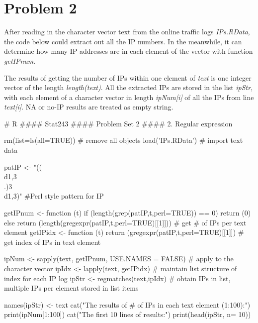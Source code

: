 \documentclass{article}
\begin{document}
\section*{Problem 2}

After reading in the character vector text from the online traffic logs \textit{IPs.RData}, the 
code below could extract out all the IP numbers. In the meanwhile, it can determine how many IP 
addresses are in each element of the vector with function \textit{getIPnum}.


The results of getting the number of IPs within one element of \textit{text} is one integer vector of 
the length \textit{length(text)}. All the extracted IPs are stored in the list \textit{ipStr}, 
with each element of a character vector in length \textit{ipNum[i]} of all the IPs from line \textit{text[i]}.
NA or no-IP results are treated as empty string.

# R
#### Stat243
#### Problem Set 2
#### 2. Regular expression

rm(list=ls(all=TRUE)) # remove all objects
load('IPs.RData') # import text data

patIP <- "((\\d{1,3}\\.){3}\\d{1,3})" #Perl style pattern for IP

getIPnum <- function (t) { if (length(grep(patIP,t,perl=TRUE)) == 0) {return (0)}
                           else {
                           return (length(gregexpr(patIP,t,perl=TRUE)[[1]]))
                           }
                         } # get # of IPs per text element
getIPidx <- function (t) { return (gregexpr(patIP,t,perl=TRUE)[[1]]) } # get index of IPs in text element

ipNum <- sapply(text, getIPnum, USE.NAMES = FALSE) # apply to the character vector
ipIdx <- lapply(text, getIPidx) # maintain list structure of index for each IP log
ipStr <- regmatches(text,ipIdx) # obtain IPs in list, multiple IPs per element stored in list items

names(ipStr) <- text
cat("The results of # of IPs in each text element (1:100):\n")
print(ipNum[1:100])
cat("The first 10 lines of results:\n")
print(head(ipStr, n= 10))
\end{document}
